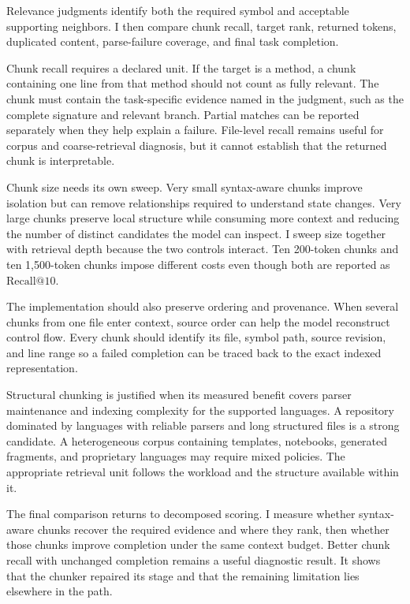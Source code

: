 Relevance judgments identify both the required symbol and acceptable supporting neighbors. I then compare chunk recall, target rank, returned tokens, duplicated content, parse-failure coverage, and final task completion.

Chunk recall requires a declared unit. If the target is a method, a chunk containing one line from that method should not count as fully relevant. The chunk must contain the task-specific evidence named in the judgment, such as the complete signature and relevant branch. Partial matches can be reported separately when they help explain a failure. File-level recall remains useful for corpus and coarse-retrieval diagnosis, but it cannot establish that the returned chunk is interpretable.

Chunk size needs its own sweep. Very small syntax-aware chunks improve isolation but can remove relationships required to understand state changes. Very large chunks preserve local structure while consuming more context and reducing the number of distinct candidates the model can inspect. I sweep size together with retrieval depth because the two controls interact. Ten 200-token chunks and ten 1,500-token chunks impose different costs even though both are reported as \(\mathrm{Recall}@10\).

The implementation should also preserve ordering and provenance. When several chunks from one file enter context, source order can help the model reconstruct control flow. Every chunk should identify its file, symbol path, source revision, and line range so a failed completion can be traced back to the exact indexed representation.

Structural chunking is justified when its measured benefit covers parser maintenance and indexing complexity for the supported languages. A repository dominated by languages with reliable parsers and long structured files is a strong candidate. A heterogeneous corpus containing templates, notebooks, generated fragments, and proprietary languages may require mixed policies. The appropriate retrieval unit follows the workload and the structure available within it.

The final comparison returns to decomposed scoring. I measure whether syntax-aware chunks recover the required evidence and where they rank, then whether those chunks improve completion under the same context budget. Better chunk recall with unchanged completion remains a useful diagnostic result. It shows that the chunker repaired its stage and that the remaining limitation lies elsewhere in the path.

